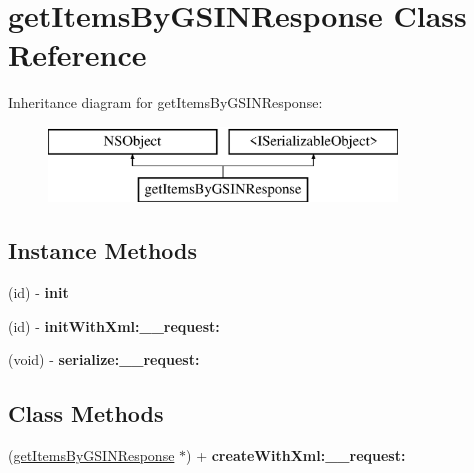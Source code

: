 \hypertarget{interfaceget_items_by_g_s_i_n_response}{}\section{get\+Items\+By\+G\+S\+I\+N\+Response Class Reference}
\label{interfaceget_items_by_g_s_i_n_response}
Inheritance diagram for get\+Items\+By\+G\+S\+I\+N\+Response\+:\begin{figure}[H]
\begin{center}
\leavevmode
\includegraphics[height=2.000000cm]{interfaceget_items_by_g_s_i_n_response}
\end{center}
\end{figure}
\subsection*{Instance Methods}
\begin{DoxyCompactItemize}
\item 
\hypertarget{interfaceget_items_by_g_s_i_n_response_a0fc5ed98e1bea0d04ea53d6f0177df3c}{}(id) -\/ {\bfseries init}\label{interfaceget_items_by_g_s_i_n_response_a0fc5ed98e1bea0d04ea53d6f0177df3c}

\item 
\hypertarget{interfaceget_items_by_g_s_i_n_response_aa2ea12c4abef10168436b50baca482e7}{}(id) -\/ {\bfseries init\+With\+Xml\+:\+\_\+\+\_\+request\+:}\label{interfaceget_items_by_g_s_i_n_response_aa2ea12c4abef10168436b50baca482e7}

\item 
\hypertarget{interfaceget_items_by_g_s_i_n_response_a287a88362dc942aca113fe100efe7b10}{}(void) -\/ {\bfseries serialize\+:\+\_\+\+\_\+request\+:}\label{interfaceget_items_by_g_s_i_n_response_a287a88362dc942aca113fe100efe7b10}

\end{DoxyCompactItemize}
\subsection*{Class Methods}
\begin{DoxyCompactItemize}
\item 
\hypertarget{interfaceget_items_by_g_s_i_n_response_ac83d7aa6a2e14ca0268e96b245d8db90}{}(\hyperlink{interfaceget_items_by_g_s_i_n_response}{get\+Items\+By\+G\+S\+I\+N\+Response} $\ast$) + {\bfseries create\+With\+Xml\+:\+\_\+\+\_\+request\+:}\label{interfaceget_items_by_g_s_i_n_response_ac83d7aa6a2e14ca0268e96b245d8db90}

\end{DoxyCompactItemize}
